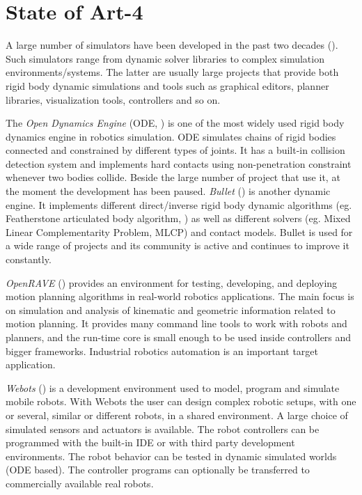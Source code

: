 \section{State of Art-4}\label{state_of_art4}
A large number of simulators  have been developed in the past two decades (\cite{DBLP:journals/corr/IvaldiPN14}). Such simulators range from dynamic solver libraries to complex simulation environments/systems. The latter are usually large projects that provide both rigid body dynamic simulations and tools such as graphical editors, planner libraries, visualization tools, controllers and so on.  

The \emph{Open Dynamics Engine} (ODE, \cite{opende}) is one of the most widely used rigid body dynamics engine in robotics simulation. ODE simulates chains of rigid bodies connected and constrained by different types of joints. It has a built-in collision detection system and implements hard contacts using non-penetration constraint whenever two bodies collide. Beside the large number of project that use it, at the moment the development has been paused. \emph{Bullet} (\cite{bulletpe}) is another dynamic engine. It implements different direct/inverse rigid body dynamic algorithms (eg. Featherstone articulated body algorithm, \cite{Featherstone:2007:RBD:1324846}) as well as different solvers (eg. Mixed Linear Complementarity Problem, MLCP) and contact models. Bullet is used for a wide range of projects and its community is active and continues to improve it constantly.

\emph{OpenRAVE} (\cite{diankovthesis}) provides an environment for testing, developing, and deploying motion planning algorithms in real-world robotics applications. The main focus is on simulation and analysis of kinematic and geometric information related to motion planning. It provides many command line tools to work with robots and planners, and the run-time core is small enough to be used inside controllers and bigger frameworks. Industrial robotics automation is an important target application. 

\emph{Webots}  (\cite{Michel04cyberboticsltd}) is a development environment used to model, program and simulate mobile robots. With Webots the user can design complex robotic setups, with one or several, similar or different robots, in a shared environment. A large choice of simulated sensors and actuators is available. The robot controllers can be programmed with the built-in IDE or with third party development environments. The robot behavior can be tested in dynamic simulated worlds (ODE based). The controller programs can optionally be transferred to commercially available real robots.

